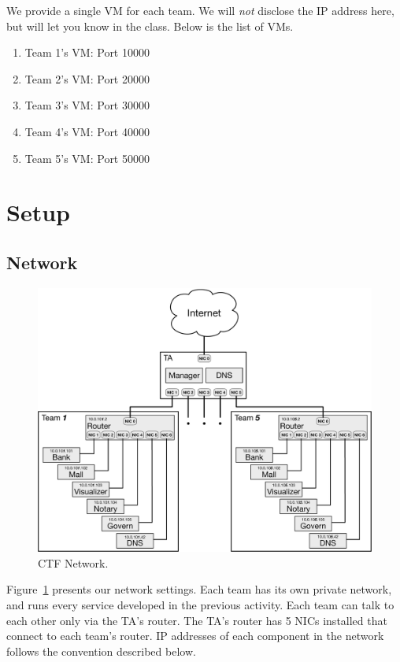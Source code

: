 \documentclass[a4paper, 11pt]{article}
\theoremstyle{definition}
\begin{document}
{We provide a single VM for each team. We will \emph{not} disclose the
IP address here, but will let you know in the class. Below is the list
of VMs.
%
\begin{enumerate}
%
  \item Team 1's VM: Port 10000
  \item Team 2's VM: Port 20000
  \item Team 3's VM: Port 30000
  \item Team 4's VM: Port 40000
  \item Team 5's VM: Port 50000
%
\end{enumerate}

\section{Setup}

\subsection{Network}

\begin{figure}[t]
  \centering
  \includegraphics[width=\linewidth]{figs/network}
  \caption{CTF Network.}
  \label{fig:net}
\end{figure}

Figure~\ref{fig:net} presents our network settings. Each team has its
own private network, and runs every service developed in the previous
activity. Each team can talk to each other only via the TA's router.
The TA's router has 5 NICs installed that connect to each team's
router. IP addresses of each component in the network follows the
convention described below.

}
\end{document}
